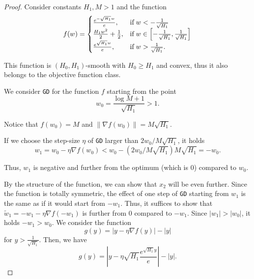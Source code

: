 \documentclass[a4paper,11pt]{article}
\newcommand{\algname}[1]{\texttt{#1}}
\newcommand{\1}{\mathbbm{1}}
\theoremstyle{plain}
\begin{document}
\begin{proof}

Consider constants $H_1, M > 1$ and the function
\begin{align*}
f(w)=
    \begin{cases}
  \frac{e^{-\sqrt{H_1} w}}{e}, & \text{if} \hspace{1mm} w<-\frac{1}{\sqrt{H_1}} \\
  \frac{H_1 w^2}{2}+\frac{1}{2}, & \text{if} \hspace{1mm} w \in \left[-\frac{1}{\sqrt{H_1}},\frac{1}{\sqrt{H_1}} \right] \\
  \frac{e^{\sqrt{H_1} w}}{e}, & \text{if} \hspace{1mm} w>\frac{1}{\sqrt{H_1}}.
\end{cases}
\end{align*}

This function is $(H_0, H_1)$-smooth with $H_0 \geq H_1$ and convex, thus it also belongs to the objective function class.

We consider \algname{GD} for the function $f$ starting from the point
\begin{equation*}
    w_0 = \frac{\log M+1}{\sqrt{H_1}}>1.
\end{equation*}

Notice that $f(w_0) = M$ and $\|\nabla f(w_0)\| = M \sqrt{H_1}$. 

If we choose the step-size $\eta$ of \algname{GD} larger than $2w_0/M\sqrt{H_1}$, it holds
\begin{equation*}
    w_1=w_0-\eta \nabla f(w_0) < w_0 - (2 w_0 /M\sqrt{H_1}) M \sqrt{H_1} = -w_0.
\end{equation*}

Thus, $w_1$ is negative and further from the optimum (which is $0$) compared to $w_0$.

By the structure of the function, we can show that $x_2$ will be even further. Since the function is totally symmetric, the effect of one step of \algname{GD} starting from $w_1$ is the same as if it would start from $-w_1$. Thus, it suffices to show that $\tilde w_1 = -w_1 - \eta \nabla f(-w_1)$ is further from $0$ compared to $-w_1$. Since $|w_1|>|w_0|$, it holds $-w_1>w_0$. We consider the function
\begin{equation*}
    g(y) = |y-\eta \nabla f(y)|-|y|
\end{equation*}
for $y>\frac{1}{\sqrt{H_1}}$. Then, we have
\begin{equation*}
    g(y) = \left |y-\eta \sqrt{H_1} \frac{e^{\sqrt{H_1}y}}{e} \right|-|y|.
\end{equation*}


\end{proof}
\end{document}
